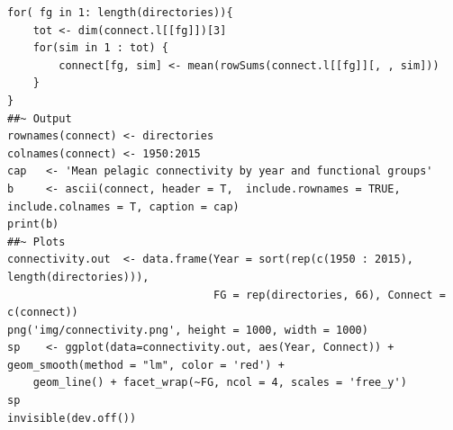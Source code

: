 \documentclass[11pt]{article}
\begin{document}
\begin{itemize}
\begin{itemize}
\begin{verbatim}
for( fg in 1: length(directories)){
    tot <- dim(connect.l[[fg]])[3]
    for(sim in 1 : tot) {
        connect[fg, sim] <- mean(rowSums(connect.l[[fg]][, , sim]))
    }
}
##~ Output
rownames(connect) <- directories
colnames(connect) <- 1950:2015
cap   <- 'Mean pelagic connectivity by year and functional groups'
b     <- ascii(connect, header = T,  include.rownames = TRUE, include.colnames = T, caption = cap)
print(b)
##~ Plots
connectivity.out  <- data.frame(Year = sort(rep(c(1950 : 2015), length(directories))),
                                FG = rep(directories, 66), Connect = c(connect))
png('img/connectivity.png', height = 1000, width = 1000)
sp    <- ggplot(data=connectivity.out, aes(Year, Connect)) + geom_smooth(method = "lm", color = 'red') +
    geom_line() + facet_wrap(~FG, ncol = 4, scales = 'free_y')
sp
invisible(dev.off())
\end{verbatim}


\end{itemize}
\end{itemize}
\end{document}
